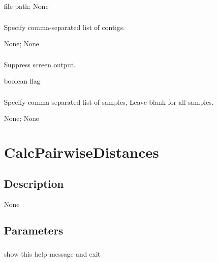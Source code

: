\documentclass[letterpaper,11pt,english]{sphinxmanual}
\begin{document}
 file path;  None


\subsubsection{}
\label{\detokenize{prog_desc:id51}}
 Specify comma-separated list of contigs.

 None;  None


\subsubsection{}
\label{\detokenize{prog_desc:id52}}
 Suppress screen output.

 boolean flag


\subsubsection{}
\label{\detokenize{prog_desc:id53}}
 Specify comma-separated list of samples, Leave blank for all samples.

 None;  None


\section{CalcPairwiseDistances}
\label{\detokenize{prog_desc:calcpairwisedistances}}

\subsection{Description}
\label{\detokenize{prog_desc:id54}}
None


\subsection{Parameters}
\label{\detokenize{prog_desc:id55}}

\subsubsection{}
\label{\detokenize{prog_desc:id56}}
 show this help message and exit
\end{document}
